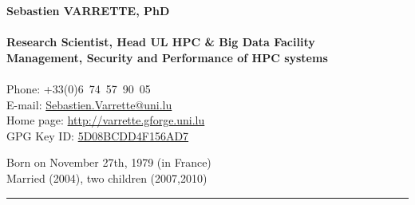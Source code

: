 \documentclass{cv}
\begin{document}
\begin{chapeau}
  \begin{adresse}
    {\Large\textbf{Sebastien VARRETTE, PhD}}\\
    \ligne\\
    \textbf{Research Scientist, Head UL HPC \& Big Data Facility}\\
    \textbf{Management, Security and Performance of HPC systems}\\
    \ligne\\
    Phone: +33(0)6~74~57~90~05\\
    E-mail:    \url{Sebastien.Varrette@uni.lu}\\
    Home page: \url{http://varrette.gforge.uni.lu}\\
    GPG Key ID: \href{https://pgp.mit.edu/pks/lookup?op=vindex&search=0x5D08BCDD4F156AD7}{5D08BCDD4F156AD7}
  \end{adresse}
  \begin{etatcivil}

    Born on November 27th, 1979 (in France)\\
    Married (2004), two children (2007,2010)\\
  \end{etatcivil}
\end{chapeau}
\vspace*{0.5em}
\noindent\rule{\textwidth}{0.4pt}
\end{document}

